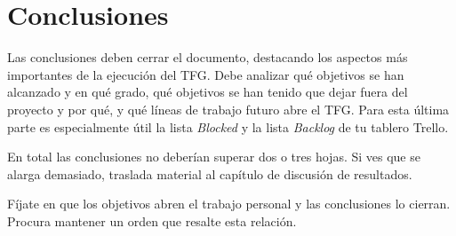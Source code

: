\chapter{Conclusiones}
\label{ch:conclusiones}

Las conclusiones deben cerrar el documento, destacando los aspectos más importantes de la ejecución del TFG.  Debe analizar qué objetivos se han alcanzado y en qué grado, qué objetivos se han tenido que dejar fuera del proyecto y por qué, y qué líneas de trabajo futuro abre el TFG.  Para esta última parte es especialmente útil la lista \emph{Blocked} y la lista \emph{Backlog} de tu tablero Trello.

En total las conclusiones no deberían superar dos o tres hojas.  Si ves que se alarga demasiado, traslada material al capítulo de discusión de resultados.

Fíjate en que los objetivos abren el trabajo personal y las conclusiones lo cierran.  Procura mantener un orden que resalte esta relación.